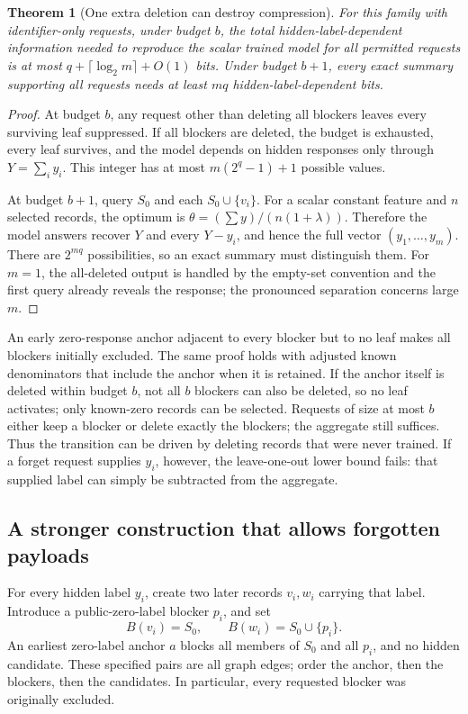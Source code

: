 \documentclass[11pt,a4paper]{article}
\newtheorem{theorem}{Theorem}[section]
\theoremstyle{definition}\newtheorem{definition}[theorem]{Definition}
\begin{document}
\begin{theorem}[One extra deletion can destroy compression]\label{thm:phase}
For this family with identifier-only requests, under budget $b$, the total hidden-label-dependent information needed to reproduce the scalar trained model for all permitted requests is at most $q+\lceil\log_2m\rceil+O(1)$ bits. Under budget $b+1$, every exact summary supporting all requests needs at least $mq$ hidden-label-dependent bits.
\end{theorem}
\begin{proof}
At budget $b$, any request other than deleting all blockers leaves every surviving leaf suppressed. If all blockers are deleted, the budget is exhausted, every leaf survives, and the model depends on hidden responses only through $Y=\sum_i y_i$. This integer has at most $m(2^q-1)+1$ possible values.

At budget $b+1$, query $S_0$ and each $S_0\cup\{v_i\}$. For a scalar constant feature and $n$ selected records, the optimum is $\theta=(\sum y)/(n(1+\lambda))$. Therefore the model answers recover $Y$ and every $Y-y_i$, and hence the full vector $(y_1,\ldots,y_m)$. There are $2^{mq}$ possibilities, so an exact summary must distinguish them. For $m=1$, the all-deleted output is handled by the empty-set convention and the first query already reveals the response; the pronounced separation concerns large $m$.
\end{proof}

An early zero-response anchor adjacent to every blocker but to no leaf makes all blockers initially excluded. The same proof holds with adjusted known denominators that include the anchor when it is retained. If the anchor itself is deleted within budget $b$, not all $b$ blockers can also be deleted, so no leaf activates; only known-zero records can be selected. Requests of size at most $b$ either keep a blocker or delete exactly the blockers; the aggregate still suffices. Thus the transition can be driven by deleting records that were never trained. If a forget request supplies $y_i$, however, the leave-one-out lower bound fails: that supplied label can simply be subtracted from the aggregate.

\subsection{A stronger construction that allows forgotten payloads}
For every hidden label $y_i$, create two later records $v_i,w_i$ carrying that label. Introduce a public-zero-label blocker $p_i$, and set
\[
 B(v_i)=S_0,\qquad B(w_i)=S_0\cup\{p_i\}.
\]
An earliest zero-label anchor $a$ blocks all members of $S_0$ and all $p_i$, and no hidden candidate. These specified pairs are all graph edges; order the anchor, then the blockers, then the candidates. In particular, every requested blocker was originally excluded.
\end{document}
